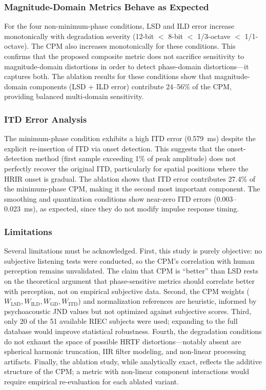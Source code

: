 \documentclass[12pt,a4paper]{article}
\begin{document}
\subsubsection*{Magnitude-Domain Metrics Behave as Expected}

For the four non-minimum-phase conditions, LSD and ILD error increase monotonically with degradation severity (12-bit $<$ 8-bit $<$ 1/3-octave $<$ 1/1-octave). The CPM also increases monotonically for these conditions. This confirms that the proposed composite metric does not sacrifice sensitivity to magnitude-domain distortions in order to detect phase-domain distortions---it captures both. The ablation results for these conditions show that magnitude-domain components (LSD + ILD error) contribute 24--56\% of the CPM, providing balanced multi-domain sensitivity.

\subsubsection*{ITD Error Analysis}

The minimum-phase condition exhibits a high ITD error (0.579~ms) despite the explicit re-insertion of ITD via onset detection. This suggests that the onset-detection method (first sample exceeding 1\% of peak amplitude) does not perfectly recover the original ITD, particularly for spatial positions where the HRIR onset is gradual. The ablation shows that ITD error contributes 27.4\% of the minimum-phase CPM, making it the second most important component. The smoothing and quantization conditions show near-zero ITD errors (0.003--0.023~ms), as expected, since they do not modify impulse response timing.

\subsubsection*{Limitations}

Several limitations must be acknowledged. First, this study is purely objective: no subjective listening tests were conducted, so the CPM's correlation with human perception remains unvalidated. The claim that CPM is ``better'' than LSD rests on the theoretical argument that phase-sensitive metrics should correlate better with perception, not on empirical subjective data. Second, the CPM weights ($W_{\mathrm{LSD}}, W_{\mathrm{ILD}}, W_{\mathrm{GD}}, W_{\mathrm{ITD}}$) and normalization references are heuristic, informed by psychoacoustic JND values but not optimized against subjective scores. Third, only 20 of the 51 available RIEC subjects were used; expanding to the full database would improve statistical robustness. Fourth, the degradation conditions do not exhaust the space of possible HRTF distortions---notably absent are spherical harmonic truncation, IIR filter modeling, and non-linear processing artifacts. Finally, the ablation study, while analytically exact, reflects the additive structure of the CPM; a metric with non-linear component interactions would require empirical re-evaluation for each ablated variant.



\end{document}

